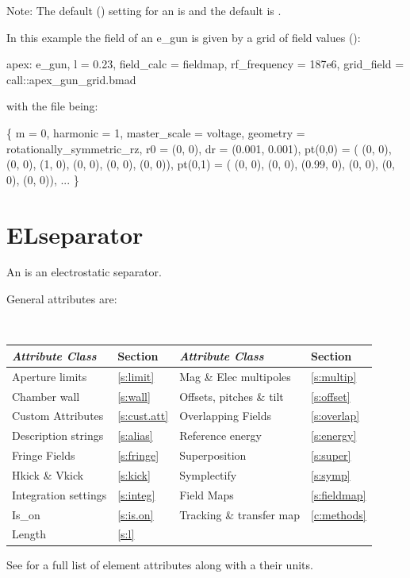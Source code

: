 Note: The default  () setting for an
 is  and the default
 is .

In this example the field of an e_gun is given by a grid of field
values ():
\begin{example}
  apex: e_gun, l = 0.23, field_calc = fieldmap, rf_frequency = 187e6, 
                grid_field = call::apex_gun_grid.bmad
\end{example}
with the file  being:
\begin{example}
  \{
    m = 0, harmonic = 1,
    master_scale = voltage,
    geometry = rotationally_symmetric_rz,
    r0 = (0, 0),
    dr = (0.001, 0.001),
    pt(0,0) = ( (0, 0), (0, 0), (1, 0),  (0, 0), (0, 0), (0, 0)),
    pt(0,1) = ( (0, 0), (0, 0), (0.99, 0),  (0, 0), (0, 0), (0, 0)),
    ... \}
\end{example}

\section{ELseparator}
\label{s:elsep}

An  is an electrostatic separator.

General  attributes are:
\begin{center}
\tt
\begin{tabular}{llll} \toprule
  {\sl Attribute Class}      & Section           & {\sl Attribute Class}      & Section          \\ \midrule
  Aperture limits            & \ref{s:limit}     & Mag \& Elec multipoles     & \ref{s:multip}   \\
  Chamber wall               & \ref{s:wall}      & Offsets, pitches \& tilt   & \ref{s:offset}   \\
  Custom Attributes          & \ref{s:cust.att}  & Overlapping Fields         & \ref{s:overlap}  \\
  Description strings        & \ref{s:alias}     & Reference energy           & \ref{s:energy}   \\ 
  Fringe Fields              & \ref{s:fringe}    & Superposition              & \ref{s:super}    \\
  Hkick \& Vkick             & \ref{s:kick}      & Symplectify                & \ref{s:symp}     \\
  Integration settings       & \ref{s:integ}     & Field Maps                 & \ref{s:fieldmap} \\  
  Is_on                      & \ref{s:is.on}     & Tracking \& transfer map   & \ref{c:methods}  \\ 
  Length                     & \ref{s:l}         &                            &                  \\
  \bottomrule
\end{tabular}
\end{center}
\toffset
See  for a full list of element attributes along with a their units.


